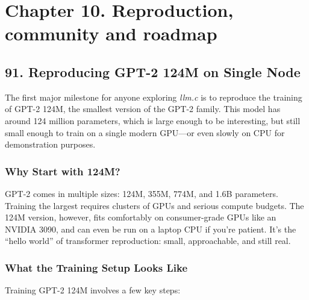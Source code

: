 \documentclass[
  letterpaper,
  DIV=11,
  numbers=noendperiod]{scrreprt}
\begin{document}
\section{Chapter 10. Reproduction, community and
roadmap}\label{chapter-10.-reproduction-community-and-roadmap}

\subsection{91. Reproducing GPT-2 124M on Single
Node}\label{reproducing-gpt-2-124m-on-single-node}

The first major milestone for anyone exploring \emph{llm.c} is to
reproduce the training of GPT-2 124M, the smallest version of the GPT-2
family. This model has around 124 million parameters, which is large
enough to be interesting, but still small enough to train on a single
modern GPU---or even slowly on CPU for demonstration purposes.

\subsubsection{Why Start with 124M?}\label{why-start-with-124m}

GPT-2 comes in multiple sizes: 124M, 355M, 774M, and 1.6B parameters.
Training the largest requires clusters of GPUs and serious compute
budgets. The 124M version, however, fits comfortably on consumer-grade
GPUs like an NVIDIA 3090, and can even be run on a laptop CPU if you're
patient. It's the ``hello world'' of transformer reproduction: small,
approachable, and still real.

\subsubsection{What the Training Setup Looks
Like}\label{what-the-training-setup-looks-like}

Training GPT-2 124M involves a few key steps:
\end{document}
